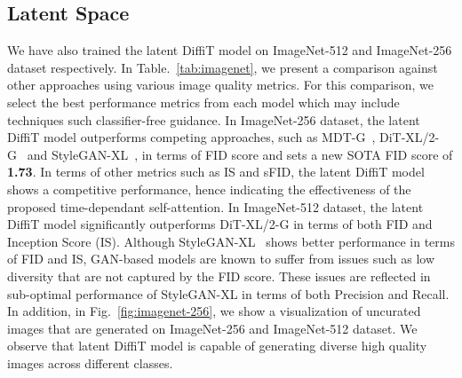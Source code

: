 \subsection{Latent Space}
We have also trained the latent DiffiT model on ImageNet-512 and ImageNet-256 dataset respectively. In Table.~\ref{tab:imagenet}, we present a comparison against other approaches using various image quality metrics. For this comparison, we select the best performance metrics from each model which may include techniques such classifier-free guidance. In ImageNet-256 dataset, the latent DiffiT model outperforms competing approaches, such as MDT-G~\cite{gao2023masked}, DiT-XL/2-G~\cite{peebles2022scalable} and StyleGAN-XL~\cite{sauer2022stylegan}, in terms of FID score and sets a new SOTA FID score of \textbf{1.73}. In terms of other metrics such as IS and sFID, the latent DiffiT model shows a competitive performance, hence indicating the effectiveness of the proposed time-dependant self-attention. In ImageNet-512 dataset, the latent DiffiT model significantly outperforms DiT-XL/2-G in terms of both FID and Inception Score (IS). Although StyleGAN-XL~\cite{sauer2022stylegan} shows better performance in terms of FID and IS, GAN-based models are known to suffer from issues such as low diversity that are not captured by the FID score. These issues are reflected in sub-optimal performance of StyleGAN-XL in terms of both Precision and Recall. In addition, in Fig.~\ref{fig:imagenet-256}, we show a visualization of uncurated images that are generated on ImageNet-256 and ImageNet-512 dataset. We observe that latent DiffiT model is capable of generating diverse high quality images across different classes.   

